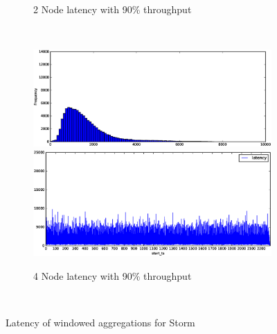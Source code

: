 \begin{figure}
\begin{subfigure}[b]{0.3\textwidth}
        \caption{2 Node latency with 90\% throughput }
    \end{subfigure}
    ~ 
    \begin{subfigure}[b]{0.3\textwidth}
        \includegraphics[width=\textwidth]{eps/storm_agg_4node_th_90_hist}
         \includegraphics[width=\textwidth]{eps/storm_agg_4node_th_90_ts}

        \caption{4 Node latency with 90\% throughput }
    \end{subfigure}
    ~ 



        \caption{Latency of windowed aggregations for Storm}
\end{figure}